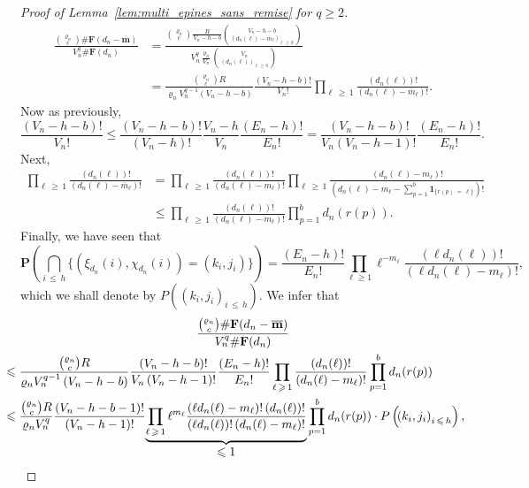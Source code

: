\documentclass[AHL,Unicode,longabstracts,published]{cedram}
\newcommand{\ensembles}[1]{\mathbf{#1}}
\renewcommand{\P}{\ensembles{P}}
\newcommand{\1}{\ensembles{1}}
\newcommand{\ind}[1]{\1_{\{#1\}}}
\newcommand{\m}{\mathbf{m}}
\renewcommand{\le}{\leqslant}
\renewcommand{\ge}{\geqslant}
\newcommand{\edges}{E}
\newcommand{\vertices}{V}
\begin{document}
\begin{proof}[Proof of Lemma~\ref{lem:multi_epines_sans_remise} for $q \ge 2$]
\begin{align*}
\frac{\binom{\varrho_n}{c} \#\ensembles{F}\left(d_n - \overline{\m}\right)}{\vertices_n^q \#\ensembles{F}(d_n)} &= \frac{\binom{\varrho_n}{c} \frac{R}{\vertices_n-h-b} \binom{\vertices_n-h-b}{\left(d_n(\ell)-\overline{m}_\ell\right)_{\ell\,\ge\, 0}}}{\vertices_n^q \frac{\varrho_n}{\vertices_n} \binom{\vertices_n}{\left(d_n(\ell)\right)_{\ell\,\ge\, 0}}}
\\
&= \frac{\binom{\varrho_n}{c} R}{\varrho_n \vertices_n^{q-1} \left(\vertices_n-h-b\right)}
\frac{\left(\vertices_n-h-b\right)!}{\vertices_n!}
\prod_{\ell\,\ge\,1} \frac{\left(d_n(\ell)\right)!}{\left(d_n(\ell)-\overline{m}_\ell\right)!}.
\end{align*}
Now as previously,
\[
\frac{\left(\vertices_n-h-b\right)!}{\vertices_n!}
\le \frac{\left(\vertices_n-h-b\right)!}{\left(\vertices_n - h\right)!} \frac{\vertices_n-h}{\vertices_n} \frac{\left(\edges_n - h\right)!}{\edges_n!} = \frac{\left(\vertices_n-h-b\right)!}{\vertices_n\left(\vertices_n - h - 1\right)!} \frac{\left(\edges_n - h\right)!}{\edges_n!}.
\]
Next,
\begin{align*}
\prod_{\ell\,\ge\,1} \frac{\left(d_n(\ell)\right)!}{\left(d_n(\ell)-\overline{m}_\ell\right)!} &= \prod_{\ell\,\ge\,1} \frac{\left(d_n(\ell)\right)!}{\left(d_n(\ell)-m_\ell\right)!}
\prod_{\ell\,\ge\,1} \frac{\left(d_n(\ell)-m_\ell\right)!}{\left(d_n(\ell)-m_\ell-\sum\limits_{p=1}^b \ind{r(p)\,=\,\ell}\right)!}
\\
&\le \prod_{\ell\,\ge\,1} \frac{\left(d_n(\ell)\right)!}{\left(d_n(\ell)-m_\ell\right)!}
\prod_{p=1}^b d_n(r(p)).
\end{align*}
Finally, we have seen that
\[
\P\left(\bigcap_{i\,\le\,h} \big\{\left(\xi_{d_n}(i), \chi_{d_n}(i)\right) = (k_i, j_i)\big\}\right) = \frac{(\edges_n - h)!}{\edges_n!} \prod_{\ell \ge 1} \ell^{- m_\ell} \frac{(\ell d_n(\ell))!}{(\ell d_n(\ell) - m_\ell)!},
\]
which we shall denote by $P((k_i, j_i)_{i\,\le\,h})$. We infer that
\begin{multline*}
\frac{\binom{\varrho_n}{c} \#\ensembles{F}(d_n - \overline{\m})}{\vertices_n^q \#\ensembles{F}(d_n)}
\\
\mkern-30mu
\begin{aligned}
&\le \frac{\binom{\varrho_n}{c} R}{\varrho_n \vertices_n^{q-1} \left(\vertices_n-h-b\right)}
\frac{\left(\vertices_n-h-b\right)!}{\vertices_n \left(\vertices_n - h - 1\right)!} \frac{\left(\edges_n - h\right)!}{\edges_n!}
\prod_{\ell\,\ge\,1} \frac{\left(d_n(\ell)\right)!}{\left(d_n(\ell)-m_\ell\right)!}
\prod_{p=1}^b d_n(r(p))
\\
&\le \frac{\binom{\varrho_n}{c} R}{\varrho_n \vertices_n^q} \frac{\left(\vertices_n-h-b-1\right)!}{\left(\vertices_n - h - 1\right)!}\!
\underbrace{\prod_{\ell\,\ge\,1} \ell^{m_\ell} \frac{\left(\ell d_n(\ell) - m_\ell\right)! \left(d_n(\ell)\right)!}{\left(\ell d_n(\ell)\right)! \left(d_n(\ell)-m_\ell\right)!}}_{\displaystyle \le 1}
\prod_{p=1}^b d_n(r(p))
\cdot P\left(\!\left(k_i, j_i\right)_{i\,\le\,h}\right),
\end{aligned}
\end{multline*}


\end{proof}
\end{document}
